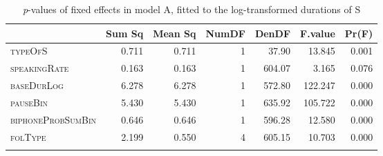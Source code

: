 \begin{table}[H]\fontsize{10}{11}
\caption{\textit{p}-values of fixed effects in model A, fitted to the log-transformed durations of S}
\label{tab:5.6}
\centering
\begin{tabular}{lrrrrrr} 
\lsptoprule
~                 & Sum Sq & Mean Sq & NumDF & DenDF  & F.value & Pr(F)  \\ 
\midrule
\textsc{typeOfS}           & 0.711  & 0.711   & 1     & 37.90  & 13.845  & 0.001  \\
\textsc{speakingRate}      & 0.163  & 0.163   & 1     & 604.07 & 3.165   & 0.076  \\
\textsc{baseDurLog}        & 6.278  & 6.278   & 1     & 572.80 & 122.247 & 0.000  \\
\textsc{pauseBin}          & 5.430  & 5.430   & 1     & 635.92 & 105.722 & 0.000  \\
\textsc{biphoneProbSumBin} & 0.646  & 0.646   & 1     & 596.28 & 12.580  & 0.000  \\
\textsc{folType}           & 2.199  & 0.550   & 4     & 605.15 & 10.703  & 0.000  \\
\lspbottomrule
\end{tabular}
\end{table}





